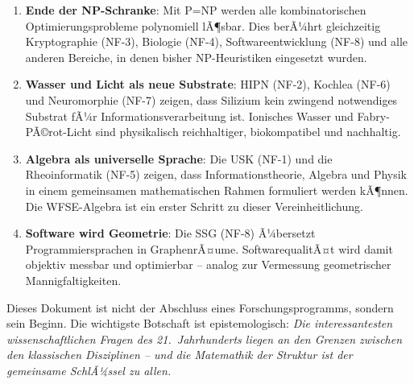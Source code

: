 ﻿\documentclass[a4paper,12pt]{scrreprt}
\theoremstyle{definition}
\begin{document}
\begin{enumerate}
  \item \textbf{Ende der NP-Schranke}: Mit P=NP werden alle
    kombinatorischen Optimierungsprobleme polynomiell lÃ¶sbar.
    Dies berÃ¼hrt gleichzeitig Kryptographie (NF-3),
    Biologie (NF-4), Softwareentwicklung (NF-8) und alle
    anderen Bereiche, in denen bisher NP-Heuristiken
    eingesetzt wurden.
  \item \textbf{Wasser und Licht als neue Substrate}: HIPN (NF-2),
    Kochlea (NF-6) und Neuromorphie (NF-7) zeigen, dass
    Silizium kein zwingend notwendiges Substrat fÃ¼r
    Informationsverarbeitung ist. Ionisches Wasser und
    Fabry-PÃ©rot-Licht sind physikalisch reichhaltiger,
    biokompatibel und nachhaltig.
  \item \textbf{Algebra als universelle Sprache}: Die USK (NF-1)
    und die Rheoinformatik (NF-5) zeigen, dass
    Informationstheorie, Algebra und Physik in einem
    gemeinsamen mathematischen Rahmen formuliert werden kÃ¶nnen.
    Die WFSE-Algebra ist ein erster Schritt zu dieser
    Vereinheitlichung.
  \item \textbf{Software wird Geometrie}: Die SSG (NF-8) Ã¼bersetzt
    Programmiersprachen in GraphenrÃ¤ume. SoftwarequalitÃ¤t
    wird damit objektiv messbar und optimierbar -- analog zur
    Vermessung geometrischer Mannigfaltigkeiten.
\end{enumerate}

\bigskip
\noindent
Dieses Dokument ist nicht der Abschluss eines Forschungsprogramms,
sondern sein Beginn. Die wichtigste Botschaft ist epistemologisch:
\emph{Die interessantesten wissenschaftlichen Fragen des 21.~Jahrhunderts
liegen an den Grenzen zwischen den klassischen Disziplinen -- und
die Matemathik der Struktur ist der gemeinsame SchlÃ¼ssel zu allen.}
\end{document}
